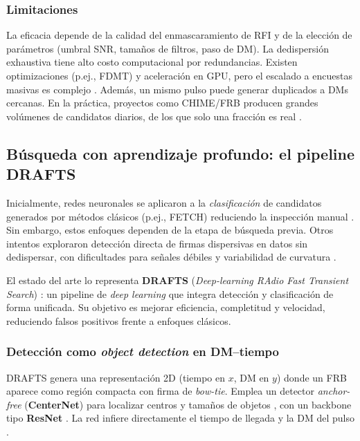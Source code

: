 \subsubsection{Limitaciones} 

La eficacia depende de la calidad del enmascaramiento de RFI y de la elección de parámetros 
(umbral SNR, tamaños de filtros, paso de DM). La de\-dispersión exhaustiva tiene alto costo 
computacional por redundancias. Existen optimizaciones (p.ej., FDMT) y aceleración en GPU, pero el 
escalado a encuestas masivas es complejo \citep{Zackay_2014_FDMT,Barsdell_2012}. Además, un mismo 
pulso puede generar duplicados a DMs cercanas. En la práctica, proyectos como CHIME/FRB producen 
grandes volúmenes de candidatos diarios, de los que solo una fracción es real \citep{CHIME2021}.

\subsection{Búsqueda con aprendizaje profundo: el pipeline DRAFTS}

Inicialmente, redes neuronales se aplicaron a la \textit{clasificación} de candidatos 
generados por métodos clásicos (p.ej., FETCH) reduciendo la inspección manual 
\citep{Agarwal_2020,Petroff_2022}. Sin embargo, estos enfoques dependen de la etapa de búsqueda previa.
 Otros intentos exploraron detección directa de firmas dispersivas en datos sin de\-dispersar, con 
 dificultades para señales débiles y variabilidad de curvatura \citep{Zhang_2020}.

El estado del arte lo representa \textbf{DRAFTS} (\textit{Deep-learning RAdio Fast Transient Search}) 
\citep{zhang2024drafts}: un pipeline de \textit{deep learning} que integra detección y 
clasificación de forma unificada. Su objetivo es mejorar eficiencia, completitud y velocidad, 
reduciendo falsos positivos frente a enfoques clásicos.

\subsubsection{Detección como \textit{object detection} en DM--tiempo} 

DRAFTS genera una representación 2D (tiempo en $x$, DM en $y$) donde un FRB aparece como región 
compacta con firma de \textit{bow-tie}. Emplea un detector \textit{anchor-free} (\textbf{CenterNet}) 
para localizar centros y tamaños de objetos \citep{Zhou_2019_CenterNet}, con un backbone tipo 
\textbf{ResNet} \citep{He_2015_ResNet}. La red infiere directamente el tiempo de llegada y la 
DM del pulso \citep{zhang2024drafts}.

